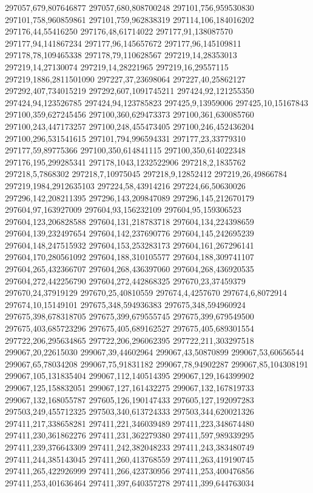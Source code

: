 297057,679,807646877
297057,680,808700248
297101,756,959530830
297101,758,960859861
297101,759,962838319
297114,106,184016202
297176,44,55416250
297176,48,61714022
297177,91,138087570
297177,94,141867234
297177,96,145657672
297177,96,145109811
297178,78,109465338
297178,79,110628567
297219,14,28353013
297219,14,27130074
297219,14,28221965
297219,16,29557115
297219,1886,2811501090
297227,37,23698064
297227,40,25862127
297292,407,734015219
297292,607,1091745211
297424,92,121255350
297424,94,123526785
297424,94,123785823
297425,9,13959006
297425,10,15167843
297100,359,627245456
297100,360,629473373
297100,361,630085760
297100,243,447173257
297100,248,455473405
297100,246,452436204
297100,296,531541615
297101,794,996594331
297177,23,33779310
297177,59,89775366
297100,350,614841115
297100,350,614022348
297176,195,299285341
297178,1043,1232522906
297218,2,1835762
297218,5,7868302
297218,7,10975045
297218,9,12852412
297219,26,49866784
297219,1984,2912635103
297224,58,43914216
297224,66,50630026
297296,142,208211395
297296,143,209847089
297296,145,212670179
297604,97,163927009
297604,93,156232109
297604,95,159306523
297604,123,206828588
297604,131,218783718
297604,134,224398659
297604,139,232497654
297604,142,237690776
297604,145,242695239
297604,148,247515932
297604,153,253283173
297604,161,267296141
297604,170,280561092
297604,188,310105577
297604,188,309741107
297604,265,432366707
297604,268,436397060
297604,268,436920535
297604,272,442256790
297604,272,442868325
297670,23,37459379
297670,24,37919129
297670,25,40810559
297674,4,4257670
297674,6,8072914
297674,10,15149101
297675,348,594936383
297675,348,594960924
297675,398,678318705
297675,399,679555745
297675,399,679549500
297675,403,685723296
297675,405,689162527
297675,405,689301554
297722,206,295634865
297722,206,296062395
297722,211,303297518
299067,20,22615030
299067,39,44602964
299067,43,50870899
299067,53,60656544
299067,65,78034208
299067,75,91831182
299067,78,94902287
299067,85,104308191
299067,105,131835404
299067,112,140514395
299067,129,164399902
299067,125,158832051
299067,127,161432275
299067,132,167819733
299067,132,168055787
297605,126,190147433
297605,127,192097283
297503,249,455712325
297503,340,613724333
297503,344,620021326
297411,217,338658281
297411,221,346039489
297411,223,348674480
297411,230,361862276
297411,231,362279380
297411,597,989339295
297411,239,376643309
297411,242,382048233
297411,243,383480749
297411,244,385143045
297411,260,413768559
297411,263,419190745
297411,265,422926999
297411,266,423730956
297411,253,400476856
297411,253,401636464
297411,397,640357278
297411,399,644763034
